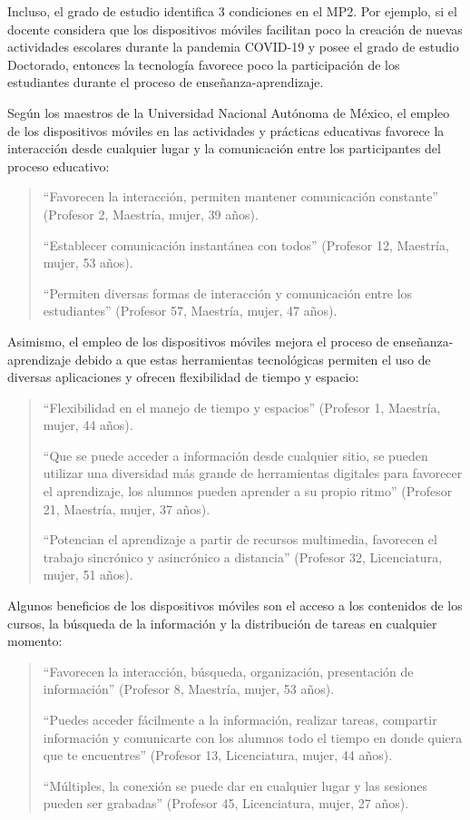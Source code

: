 \documentclass[spanish]{textolivre}
\begin{document}
Incluso, el grado de estudio identifica 3 condiciones en el MP2. Por ejemplo, si el docente considera que los dispositivos móviles facilitan poco la creación de nuevas actividades escolares durante la pandemia COVID-19 y posee el grado de estudio Doctorado, entonces la tecnología favorece poco la participación de los estudiantes durante el proceso de enseñanza-aprendizaje.

Según los maestros de la Universidad Nacional Autónoma de México, el empleo de los dispositivos móviles en las actividades y prácticas educativas favorece la interacción desde cualquier lugar y la comunicación entre los participantes del proceso educativo:

\begin{quote}
“Favorecen la interacción, permiten mantener comunicación constante” (Profesor 2, Maestría, mujer, 39 años).

“Establecer comunicación instantánea con todos” (Profesor 12, Maestría, mujer, 53 años).

“Permiten diversas formas de interacción y comunicación entre los estudiantes” (Profesor 57, Maestría, mujer, 47 años).
\end{quote}

Asimismo, el empleo de los dispositivos móviles mejora el proceso de enseñanza-aprendizaje debido a que estas herramientas tecnológicas permiten el uso de diversas aplicaciones y ofrecen flexibilidad de tiempo y espacio:

\begin{quote}
“Flexibilidad en el manejo de tiempo y espacios” (Profesor 1, Maestría, mujer, 44 años).

“Que se puede acceder a información desde cualquier sitio, se pueden utilizar una diversidad más grande de herramientas digitales para favorecer el aprendizaje, los alumnos pueden aprender a su propio ritmo” (Profesor 21, Maestría, mujer, 37 años).

“Potencian el aprendizaje a partir de recursos multimedia, favorecen el trabajo sincrónico y asincrónico a distancia” (Profesor 32, Licenciatura, mujer, 51 años).
\end{quote}

Algunos beneficios de los dispositivos móviles son el acceso a los contenidos de los cursos, la búsqueda de la información y la distribución de tareas en cualquier momento:

\begin{quote}
“Favorecen la interacción, búsqueda, organización, presentación de información” (Profesor 8, Maestría, mujer, 53 años).

“Puedes acceder fácilmente a la información, realizar tareas, compartir información y comunicarte con los alumnos todo el tiempo en donde quiera que te encuentres” (Profesor 13, Licenciatura, mujer, 44 años).

“Múltiples, la conexión se puede dar en cualquier lugar y las sesiones pueden ser grabadas” (Profesor 45, Licenciatura, mujer, 27 años).
\end{quote}
\end{document}

